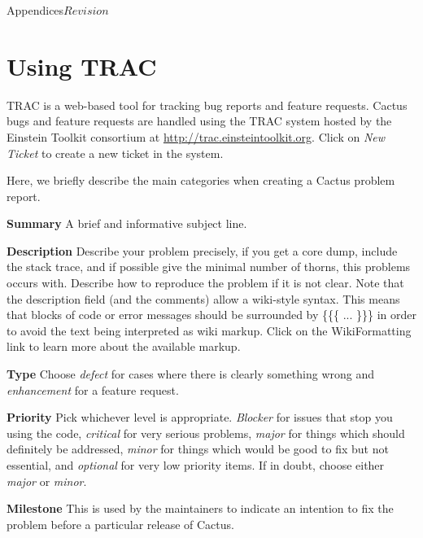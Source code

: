 \begin{cactuspart}{Appendices}{}{$Revision$}
\begin{Lentry}
\end{Lentry}


\chapter{Using TRAC}
\label{sec:Appendix.trac}

TRAC is a web-based tool for tracking bug reports and feature
requests.  Cactus bugs and feature requests are handled using the TRAC
system hosted by the Einstein Toolkit consortium at
\url{http://trac.einsteintoolkit.org}.  Click on {\em New Ticket} to
create a new ticket in the system.

Here, we briefly describe the main categories when creating a Cactus
problem report.
\begin{Lentry}
\item[{\bf Summary}] A brief and informative subject line.

\item[{\bf Description}] Describe your problem precisely, if you get a
  core dump, include the stack trace, and if possible give the minimal
  number of thorns, this problems occurs with.  Describe how to
  reproduce the problem if it is not clear.  Note that the description
  field (and the comments) allow a wiki-style syntax.  This means that
  blocks of code or error messages should be surrounded by \{\{\{
  ... \}\}\} in order to avoid the text being interpreted as wiki
  markup.  Click on the WikiFormatting link to learn more about the
  available markup.

\item[{\bf Type}] Choose {\em defect} for cases where there is clearly
something wrong and {\em enhancement} for a feature request.

\item[{\bf Priority}] Pick whichever level is appropriate.  {\em
  Blocker} for issues that stop you using the code, {\em critical} for
  very serious problems, {\em major} for things which should
  definitely be addressed, {\em minor} for things which would be good
  to fix but not essential, and {\em optional} for very low priority
  items.  If in doubt, choose either {\em major} or {\em minor}.

\item[{\bf Milestone}] This is used by the maintainers to indicate an
  intention to fix the problem before a particular release of Cactus.


\end{Lentry}
\end{cactuspart}
